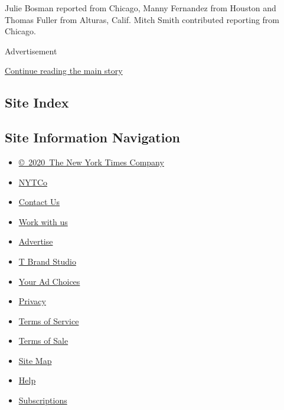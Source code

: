 Julie Bosman reported from Chicago, Manny Fernandez from Houston and
Thomas Fuller from Alturas, Calif. Mitch Smith contributed reporting
from Chicago.

Advertisement

\protect\hyperlink{after-bottom}{Continue reading the main story}

\hypertarget{site-index}{%
\subsection{Site Index}\label{site-index}}

\hypertarget{site-information-navigation}{%
\subsection{Site Information
Navigation}\label{site-information-navigation}}

\begin{itemize}
\tightlist
\item
  \href{https://help.nytimes.com/hc/en-us/articles/115014792127-Copyright-notice}{©~2020~The
  New York Times Company}
\end{itemize}

\begin{itemize}
\tightlist
\item
  \href{https://www.nytco.com/}{NYTCo}
\item
  \href{https://help.nytimes.com/hc/en-us/articles/115015385887-Contact-Us}{Contact
  Us}
\item
  \href{https://www.nytco.com/careers/}{Work with us}
\item
  \href{https://nytmediakit.com/}{Advertise}
\item
  \href{http://www.tbrandstudio.com/}{T Brand Studio}
\item
  \href{https://www.nytimes.com/privacy/cookie-policy\#how-do-i-manage-trackers}{Your
  Ad Choices}
\item
  \href{https://www.nytimes.com/privacy}{Privacy}
\item
  \href{https://help.nytimes.com/hc/en-us/articles/115014893428-Terms-of-service}{Terms
  of Service}
\item
  \href{https://help.nytimes.com/hc/en-us/articles/115014893968-Terms-of-sale}{Terms
  of Sale}
\item
  \href{https://spiderbites.nytimes.com}{Site Map}
\item
  \href{https://help.nytimes.com/hc/en-us}{Help}
\item
  \href{https://www.nytimes.com/subscription?campaignId=37WXW}{Subscriptions}
\end{itemize}
